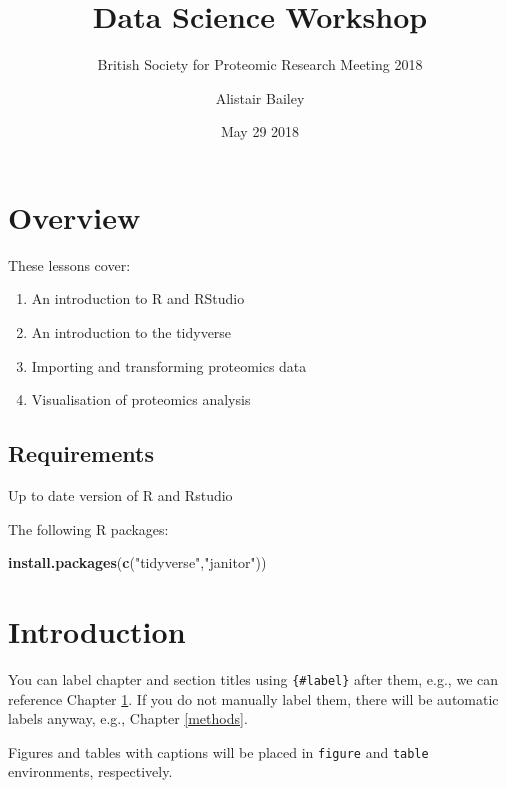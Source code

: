 \documentclass[12pt,]{book}
\title{Data Science Workshop}
\subtitle{British Society for Proteomic Research Meeting 2018}
\author{Alistair Bailey}
\date{May 29 2018}
\newenvironment{Shaded}{\begin{snugshade}}{\end{snugshade}}
\newcommand{\KeywordTok}[1]{\textcolor[rgb]{0.13,0.29,0.53}{\textbf{#1}}}
\newcommand{\StringTok}[1]{\textcolor[rgb]{0.31,0.60,0.02}{#1}}
\newcommand{\NormalTok}[1]{#1}
\providecommand{\tightlist}{%
  \setlength{\itemsep}{0pt}\setlength{\parskip}{0pt}}
\theoremstyle{definition}
\theoremstyle{definition}
\theoremstyle{definition}
\theoremstyle{remark}
\begin{document}
\maketitle

{
\setcounter{tocdepth}{1}
\tableofcontents
}
\chapter*{Overview}\label{overview}

These lessons cover:

\begin{enumerate}
\def\labelenumi{\arabic{enumi}.}
\tightlist
\item
  An introduction to R and RStudio
\item
  An introduction to the tidyverse
\item
  Importing and transforming proteomics data
\item
  Visualisation of proteomics analysis
\end{enumerate}

\section*{Requirements}\label{requirements}

Up to date version of R and Rstudio

The following R packages:

\begin{Shaded}
\begin{Highlighting}[]
\KeywordTok{install.packages}\NormalTok{(}\KeywordTok{c}\NormalTok{(}\StringTok{"tidyverse"}\NormalTok{,}\StringTok{"janitor"}\NormalTok{))}
\end{Highlighting}
\end{Shaded}

\chapter{Introduction}\label{intro}

You can label chapter and section titles using \texttt{\{\#label\}}
after them, e.g., we can reference Chapter \ref{intro}. If you do not
manually label them, there will be automatic labels anyway, e.g.,
Chapter \ref{methods}.

Figures and tables with captions will be placed in \texttt{figure} and
\texttt{table} environments, respectively.
\end{document}
